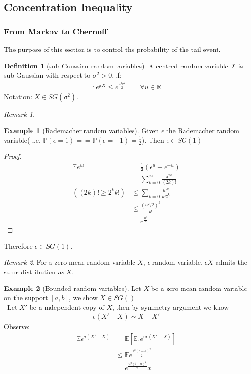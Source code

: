 \documentclass[a4paper,12pt, oneside, fleqn]{book}
\theoremstyle{definition}
\newtheorem{definition}{Definition}[section]
\newtheorem*{example}{Example}
\theoremstyle{remark}
\newtheorem*{remark}{Remark}
\begin{document}
\subsection{Concentration Inequality}
\subsubsection*{From Markov to Chernoff}
The purpose of this section is to control the probability of the tail event. 
\begin{definition}[sub-Gaussian random variables]
	A centred random variable $X$ is sub-Gaussian with respect to $\sigma^2 > 0$, if:
	\begin{align*}
		\mathbb{E} e^{\mu X} \le e^{\frac{\mu^2 \sigma^2}{2} } \qquad \forall u \in \mathbb{R}
	\end{align*}
	Notation: $X \in SG(\sigma^2)$.
\end{definition}
\begin{remark}
	
\end{remark}

\begin{example}[Rademacher random variables]
Given $\epsilon$ the Rademacher random variable( i.e. $\mathbb{P}(\epsilon = 1) = =\mathbb{P}(\epsilon = -1) = \frac{1}{2}$). Then $\epsilon \in SG(1)$
\begin{proof}
	\begin{align*}
		\mathbb{E} e^{u \epsilon} &= \frac{1}{2} (e^u + e^{-u})\\
		&= \sum_{k = 0}^\infty \frac{u^{2k}}{(2k)!}\\
((2k)! \geq 2^k k!)
 		&\leq \sum_{k =0} \frac{u^{2k}}{k!2^k}\\
 		&\leq \frac{(u^2\slash 2)^k}{k!}\\
 		& = e^{\frac{u^2}{2}}
	\end{align*}
\end{proof}
Therefore $\epsilon \in SG(1)$.
\end{example}
\begin{remark}
For a zero-mean random variable $X$, $\epsilon$ random variable. $\epsilon X$ admits the same distribution as $X$.	
\end{remark}

\begin{example}[Bounded random variables]
	Let $X$ be a zero-mean random variable on the support $[a, b]$, we show $X \in SG()$\\\
	Let $X'$ be a independent copy of $X$, then by symmetry argument we know 
	\begin{align*}
		\epsilon(X' - X) \sim X - X'
	\end{align*} 
	Observe:
	\begin{align*}
		\mathbb{E}e^{u(X'- X)} &= \mathbb{E}[ \mathbb{E}_\epsilon e^{u\epsilon(X'-X)}]\\
		&\leq \mathbb{E} e^{\frac{u^2(b-a)^2}{2}}\\
		&= e^{\frac{u^2(b-a)^2}{2}}x
	\end{align*}
\end{example}
\end{document}
